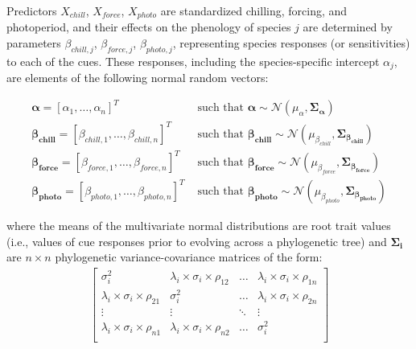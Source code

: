 \documentclass[11pt]{article}
\begin{document}
Predictors $X_{chill}$, $X_{force}$, $X_{photo}$ are standardized chilling, forcing, and photoperiod, and their effects on the phenology of species $j$ are determined by parameters $\beta_{chill,j}$, $\beta_{force,j}$, $\beta_{photo,j}$, representing species responses (or sensitivities) to each of the cues. These responses, including the species-specific intercept $\alpha_j$, are elements of the following normal random vectors:

\begin{align}
    \label{phybetas}
  \boldsymbol{\alpha} = [\alpha_1, \ldots, \alpha_n]^T & \text{ such that }
  \boldsymbol{\alpha} \sim \mathcal{N}(\mu_{\alpha},\boldsymbol{\Sigma_{\alpha}}) \\
  \boldsymbol{\beta_{chill}} =  [\beta_{chill,1}, \ldots, \beta_{chill,n}]^T & \text{ such that }
  \boldsymbol{\beta_{chill}} \sim \mathcal{N}(\mu_{\beta_{chill}},\boldsymbol{\Sigma_{\beta_{chill}}}) \nonumber \\
  \boldsymbol{\beta_{force}} =  [\beta_{force,1}, \ldots, \beta_{force,n}]^T & \text{ such that }
  \boldsymbol{\beta_{force}} \sim \mathcal{N}(\mu_{\beta_{force}},\boldsymbol{\Sigma_{\beta_{force}}}) \nonumber \\
  \boldsymbol{\beta_{photo}} =  [\beta_{photo,1}, \ldots, \beta_{photo,n}]^T & \text{ such that }
  \boldsymbol{\beta_{photo}} \sim \mathcal{N}(\mu_{\beta_{photo}},\boldsymbol{\Sigma_{\beta_{photo}}}) \nonumber
\end{align}

\noindent where the means of the multivariate normal distributions are root trait values (i.e., values of cue responses prior to evolving across a phylogenetic tree) and $\boldsymbol{\Sigma_i}$ are $n \times n$ phylogenetic variance-covariance matrices of the form: \\ 
\begin{align}
  \label{phymat}
\begin{bmatrix}
  \sigma^2_i & \lambda_i \times \sigma_{i} \times \rho_{12} & \ldots & \lambda_i \times \sigma_{i} \times \rho_{1n} \\
  \lambda_i \times \sigma_i \times \rho_{21} & \sigma^2_i & \ldots & \lambda_i \times \sigma_{i} \times \rho_{2n} \\
  \vdots & \vdots & \ddots & \vdots \\
  \lambda_i \times \sigma_i \times \rho_{n1} & \lambda_i \times \sigma_i \times \rho_{n2} & \ldots & \sigma^2_i \\
\end{bmatrix}
\end{align}
\end{document}
